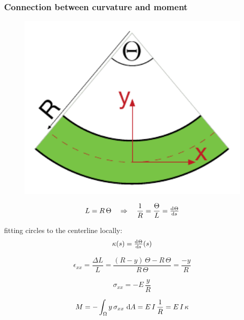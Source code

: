 \begin{frame}
  \frametitle{Connection between curvature and moment}

  \begin{multicols}{2}
    \noindent
    
    \begin{figure}
    \centering
      \includegraphics[width=13cm, keepaspectratio=true]{sections/traditional_beams/images/TimoshenkoBeam2}
    \end{figure}
    
    \begin{displaymath}
      L = R \, \Theta \quad \Rightarrow \quad \frac{1}{R} = \frac{\Theta}{L} = \od{\Theta}{s}
    \end{displaymath}
    
    \vspace{0.5em}
    fitting circles to the centerline locally:
    \begin{displaymath}
      \kappa(s) = \od{\Theta}{s}(s)
    \end{displaymath}
    
    \begin{displaymath}
      \epsilon_{xx} = \frac{\Delta L}{L} = \frac{(R-y) \, \Theta - R \, \Theta}{R \, \Theta} = \frac{-y}{R}
    \end{displaymath}
    
    \begin{displaymath}
      \sigma_{xx} = -E \, \frac{y}{R}
    \end{displaymath}
    
    \begin{displaymath}
      M = - \int_{\Omega} y \, \sigma_{xx} \, \dif A = E \, I \, \frac{1}{R} = E \, I \, \kappa
    \end{displaymath}
  \end{multicols}
\end{frame}


